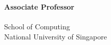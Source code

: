\documentclass[a4paper,landscape]{article}
\begin{document}
\begin{center}
    \vspace*{3cm} %

    {\Large \textbf{Associate Professor}} \\[1cm]
    { } \\[1cm] %

    {\Large School of Computing} \\[0.5cm]
    {\Large National University of Singapore}

    \vfill
\end{center}
\end{document}

